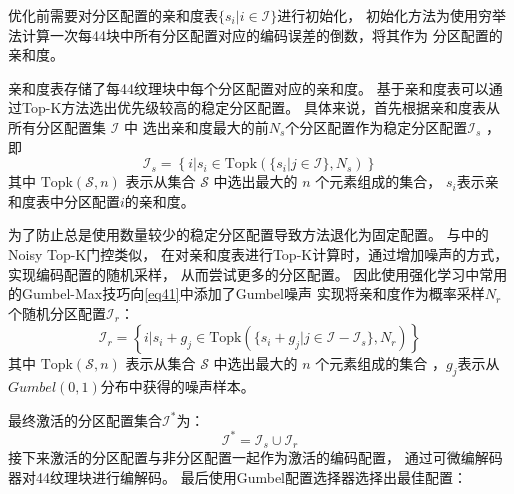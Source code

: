 优化前需要对分区配置的亲和度表$\{s_i|i\in\mathcal{I}\}$进行初始化，
初始化方法为使用穷举法计算一次每4\times4块中所有分区配置对应的编码误差的倒数，将其作为
分区配置的亲和度。

亲和度表存储了每4\times4纹理块中每个分区配置对应的亲和度。
基于亲和度表可以通过Top-K方法选出优先级较高的稳定分区配置。
具体来说，首先根据亲和度表从所有分区配置集 $\mathcal{I}$ 中
选出亲和度最大的前$N_s$个分区配置作为稳定分区配置$\mathcal{I}_s$ ，即
\begin{equation}
\label{eq41}
\mathcal{I}_s=\left\{i|s_i\in\text{Topk}(\{s_i|j\in\mathcal{I}\},N_s)\right\}
\end{equation}
其中 $\text{Topk}(\mathcal{S},n)$ 表示从集合 $\mathcal{S}$ 中选出最大的 $n$ 个元素组成的集合，
$s_i$表示亲和度表中分区配置$i$的亲和度。

为了防止总是使用数量较少的稳定分区配置导致方法退化为固定配置。
与中的Noisy Top-K门控类似，
在对亲和度表进行Top-K计算时，通过增加噪声的方式，实现编码配置的随机采样，
从而尝试更多的分区配置。
因此使用强化学习中常用的Gumbel-Max技巧\cite{jang2016categorical}向\eqref{eq41}中添加了Gumbel噪声\cite{jang2016categorical}
实现将亲和度作为概率采样$N_r$个随机分区配置$\mathcal{I}_r$：
\begin{equation}
\mathcal{I}_r=\left\{i|s_i+g_j\in\text{Topk}(\{s_i+g_j|j\in\mathcal{I}-\mathcal{I}_s\},N_r)\right\}
\end{equation}
其中 $\text{Topk}(\mathcal{S},n)$ 表示从集合 $\mathcal{S}$ 中选出最大的 $n$ 个元素组成的集合
，$g_j$表示从$Gumbel(0,1)$分布中获得的噪声样本。

最终激活的分区配置集合$\mathcal{I}^*$为：
\begin{equation}
\mathcal{I}^*=\mathcal{I}_{s}\cup\mathcal{I}_r
\end{equation}
接下来激活的分区配置与非分区配置一起作为激活的编码配置，
通过可微编解码器对4\times4纹理块进行编解码。
最后使用Gumbel配置选择器选择出最佳配置：

